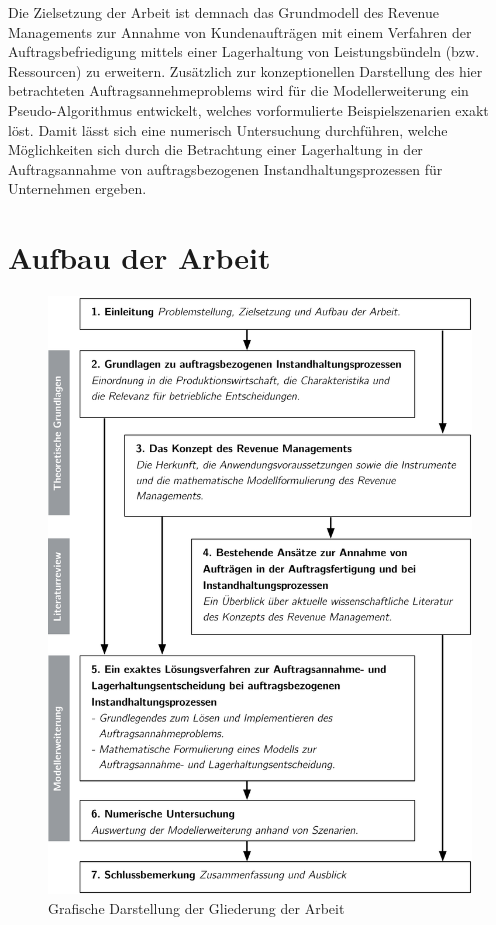 
Die Zielsetzung der Arbeit ist demnach das Grundmodell des Revenue Managements zur Annahme von Kundenaufträgen mit einem Verfahren der Auftragsbefriedigung mittels einer Lagerhaltung von Leistungsbündeln (bzw. Ressourcen) zu erweitern. Zusätzlich zur konzeptionellen Darstellung des hier betrachteten Auftragsannehmeproblems wird für die Modellerweiterung ein Pseudo-Algorithmus entwickelt, welches vorformulierte Beispielszenarien exakt löst. Damit lässt sich eine numerisch Untersuchung durchführen, welche Möglichkeiten sich durch die Betrachtung einer Lagerhaltung in der Auftragsannahme von auftragsbezogenen Instandhaltungsprozessen für Unternehmen ergeben.

\section{Aufbau der Arbeit}

\begin{figure}[h!]
  \begin{center}
    \includegraphics[width=140mm]{Bilder/Gliederung.pdf}
    \caption{Grafische Darstellung der Gliederung der Arbeit}  \label{Gliederung}
  \end{center}
\end{figure}


